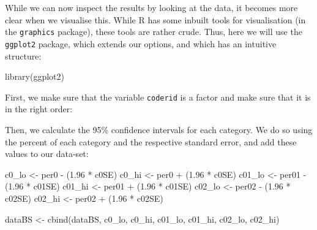 \documentclass[
]{book}
\newenvironment{Shaded}{\begin{snugshade}}{\end{snugshade}}
\newcommand{\DecValTok}[1]{\textcolor[rgb]{0.00,0.00,0.81}{#1}}
\newcommand{\FloatTok}[1]{\textcolor[rgb]{0.00,0.00,0.81}{#1}}
\newcommand{\FunctionTok}[1]{\textcolor[rgb]{0.00,0.00,0.00}{#1}}
\newcommand{\NormalTok}[1]{#1}
\newcommand{\OtherTok}[1]{\textcolor[rgb]{0.56,0.35,0.01}{#1}}
\newcommand{\SpecialCharTok}[1]{\textcolor[rgb]{0.00,0.00,0.00}{#1}}
\begin{document}
While we can now inspect the results by looking at the data, it becomes more clear when we visualise this. While R has some inbuilt tools for visualisation (in the \texttt{graphics} package), these tools are rather crude. Thus, here we will use the \texttt{ggplot2} package, which extends our options, and which has an intuitive structure:

\begin{Shaded}
\begin{Highlighting}[]
\FunctionTok{library}\NormalTok{(ggplot2)}
\end{Highlighting}
\end{Shaded}

First, we make sure that the variable \texttt{coderid} is a factor and make sure that it is in the right order:

\begin{Shaded}
\end{Shaded}

Then, we calculate the 95\% confidence intervals for each category. We do so using the percent of each category and the respective standard error, and add these values to our data-set:

\begin{Shaded}
\begin{Highlighting}[]
\NormalTok{c0\_lo }\OtherTok{\textless{}{-}}\NormalTok{ per0 }\SpecialCharTok{{-}}\NormalTok{ (}\FloatTok{1.96} \SpecialCharTok{*}\NormalTok{ c0SE)}
\NormalTok{c0\_hi }\OtherTok{\textless{}{-}}\NormalTok{ per0 }\SpecialCharTok{+}\NormalTok{ (}\FloatTok{1.96} \SpecialCharTok{*}\NormalTok{ c0SE)}
\NormalTok{c01\_lo }\OtherTok{\textless{}{-}}\NormalTok{ per01 }\SpecialCharTok{{-}}\NormalTok{ (}\FloatTok{1.96} \SpecialCharTok{*}\NormalTok{ c01SE)}
\NormalTok{c01\_hi }\OtherTok{\textless{}{-}}\NormalTok{ per01 }\SpecialCharTok{+}\NormalTok{ (}\FloatTok{1.96} \SpecialCharTok{*}\NormalTok{ c01SE)}
\NormalTok{c02\_lo }\OtherTok{\textless{}{-}}\NormalTok{ per02 }\SpecialCharTok{{-}}\NormalTok{ (}\FloatTok{1.96} \SpecialCharTok{*}\NormalTok{ c02SE)}
\NormalTok{c02\_hi }\OtherTok{\textless{}{-}}\NormalTok{ per02 }\SpecialCharTok{+}\NormalTok{ (}\FloatTok{1.96} \SpecialCharTok{*}\NormalTok{ c02SE)}

\NormalTok{dataBS }\OtherTok{\textless{}{-}} \FunctionTok{cbind}\NormalTok{(dataBS, c0\_lo, c0\_hi, c01\_lo, c01\_hi, c02\_lo, }
\NormalTok{    c02\_hi)}
\end{Highlighting}
\end{Shaded}
\end{document}
